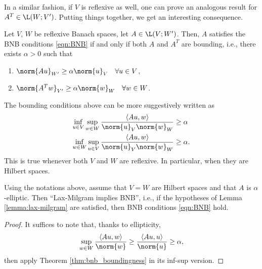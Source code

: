 In a similar fashion, if $V$ is reflexive as well, one can prove an analogous result for $A^T\in\L(W;V')$. Putting things together, we get an interesting consequence.
\begin{theorem}\label{thm:bnb_boundingness}
	Let $V$, $W$ be reflexive Banach spaces, let $A \in \L(V;W')$. Then, $A$ satisfies the BNB conditions \eqref{eqn:BNB} if and only if both $A$ and $A^T$ are bounding, i.e., there exists $\alpha>0$ such that
	\begin{enumerate}
		\item $\norm{Au}_{W'}\geq\alpha\norm{u}_V \quad  \forall u \in V$,
		\item $\norm{A^Tw}_{V'}\geq\alpha\norm{w}_W \quad  \forall w \in W$.
	\end{enumerate}
\end{theorem}

\begin{remark}
	The bounding conditions above can be more suggestively written as
	\begin{align}
		\inf_{u\in V}\sup_{w\in W}\frac{\langle Au,w \rangle}{\norm{u}_V\norm{w}_W}&\geq\alpha \\
		\inf_{w\in W}\sup_{u\in V}\frac{\langle Au,w \rangle}{\norm{u}_V\norm{w}_W}&\geq\alpha.
	\end{align}
	This is true whenever both $V$ and $W$ are reflexive. In particular, when they are Hilbert spaces.
\end{remark}

\begin{corollary}
	Using the notations above, assume that $V=W$ are Hilbert spaces and that $A$ is $\alpha$-elliptic. Then ``Lax-Milgram implies BNB'', i.e., if the hypotheses of Lemma \ref{lemma:lax-milgram} are satisfied, then BNB conditions \eqref{eqn:BNB} hold.
\end{corollary}
\begin{proof}
	It suffices to note that, thanks to ellipticity,
	\[
	\sup_{w\in W}\frac{\langle Au,w \rangle}{\norm{w}} \geq 
	\frac{\langle Au,u \rangle}{\norm{u}} \geq\alpha,
	\]
	then apply Theorem \ref{thm:bnb_boundingness} in its inf-sup version.
\end{proof}



